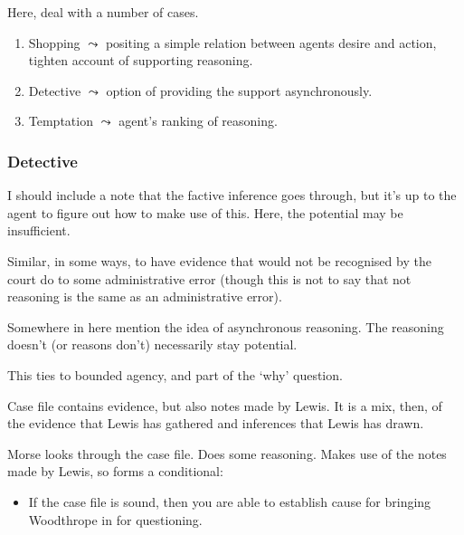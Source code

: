 \documentclass[10pt]{article}
\begin{document}
\begin{note}[Cases]
  Here, deal with a number of cases.
  \begin{enumerate}
  \item Shopping \(\leadsto\) positing a simple relation between agents desire and action, tighten account of supporting reasoning.
  \item Detective \(\leadsto\) option of providing the support asynchronously.
  \item Temptation \(\leadsto\) agent's ranking of reasoning.
  \end{enumerate}
\end{note}


\subsubsection{Detective}
\label{sec:detective}

\begin{note}
  I should include a note that the factive inference goes through, but it's up to the agent to figure out how to make use of this.
  Here, the potential may be insufficient.

  Similar, in some ways, to have evidence that would not be recognised by the court do to some administrative error (though this is not to say that not reasoning is the same as an administrative error).
\end{note}

\begin{note}[Async]
  Somewhere in here mention the idea of asynchronous reasoning.
  The reasoning doesn't (or reasons don't) necessarily stay potential.

  This ties to bounded agency, and part of the `why' question.
\end{note}

\begin{scenario}

  Case file contains evidence, but also notes made by Lewis.
  It is a mix, then, of the evidence that Lewis has gathered and inferences that Lewis has drawn.

  Morse looks through the case file.
  Does some reasoning.
  Makes use of the notes made by Lewis, so forms a conditional:

  \begin{itemize}
  \item If the case file is sound, then you are able to establish cause for bringing Woodthrope in for questioning.
  \end{itemize}

\end{scenario}
\end{document}

